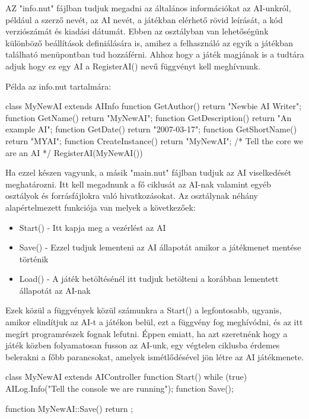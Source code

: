 AZ "info.nut" fájlban tudjuk megadni az általános információkat az AI-unkról, például a szerző nevét, az AI nevét, a játékban elérhető rövid leírását, a kód verziószámát és kiadási dátumát. Ebben az osztályban van lehetőségünk különböző beállítások definiálására is, amihez a felhasználó az egyik a játékban található menüpontban tud hozzáférni. Ahhoz hogy a játék magjának is a tudtára adjuk hogy ez egy AI a RegisterAI() nevű függvényt kell meghívnunk.

Példa az info.nut tartalmára:

\begin{cpp}
class MyNewAI extends AIInfo 
{
  function GetAuthor()        { return "Newbie AI Writer"; }
  function GetName()          { return "MyNewAI"; }
  function GetDescription()   { return "An example AI"; }
  function GetDate()          { return "2007-03-17"; }
  function GetShortName()     { return "MYAI"; }
  function CreateInstance()   { return "MyNewAI"; }
}
/* Tell the core we are an AI */
RegisterAI(MyNewAI())
\end{cpp}

Ha ezzel készen vagyunk, a másik "main.nut" fájlban tudjuk az AI viselkedését meghatározni. Itt kell megadnunk a fő ciklusát az AI-nak valamint egyéb osztályok és forrásfájlokra való hivatkozásokat. Az osztálynak néhány alapértelmezett funkciója van melyek a következőek:

\begin{itemize}
	\item Start() - Itt kapja meg a vezérlést az AI
	\item Save() - Ezzel tudjuk lementeni az AI állapotát amikor a játékmenet mentése történik
	\item Load() - A játék betöltésénél itt tudjuk betölteni a korábban lementett állapotát az AI-nak
\end{itemize}

Ezek közül a függvények közül számunkra a Start() a legfontosabb, ugyanis, amikor elindítjuk az AI-t a játékon belül, ezt a függvény fog meghívódni, és az itt megírt programrészek fognak lefutni. Éppen emiatt, ha azt szeretnénk hogy a játék közben folyamatosan fusson az AI-unk, egy végtelen ciklusba érdemes belerakni a főbb parancsokat, amelyek ismétlődésével jön létre az AI játékmenete.

\begin{cpp}
class MyNewAI extends AIController
{
  function Start()
  {
    while (true) {
      AILog.Info("Tell the console we are running");
  }
}
  function Save();
}

function MyNewAI::Save()
{
  return {};
}
\end{cpp}


